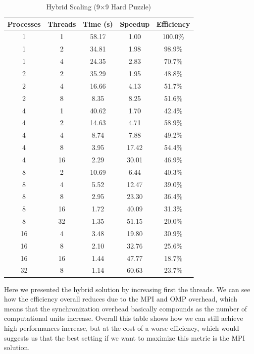 \begin{table}[htbp]
\caption{Hybrid Scaling (9×9 Hard Puzzle)}
\begin{center}
\begin{tabular}{@{}ccccc@{}}
\toprule
\textbf{Processes} & \textbf{Threads} & \textbf{Time (s)} & \textbf{Speedup} & \textbf{Efficiency} \\
\midrule
1  & 1  & 58.17 & 1.00  & 100.0\% \\
1  & 2  & 34.81 & 1.98  & 98.9\% \\
1  & 4  & 24.35 & 2.83  & 70.7\% \\
2  & 2  & 35.29 & 1.95  & 48.8\% \\
2  & 4  & 16.66 & 4.13  & 51.7\% \\
2  & 8  & 8.35  & 8.25  & 51.6\% \\
4  & 1  & 40.62 & 1.70  & 42.4\% \\
4  & 2  & 14.63 & 4.71  & 58.9\% \\
4  & 4  & 8.74  & 7.88  & 49.2\% \\
4  & 8  & 3.95  & 17.42 & 54.4\% \\
4  & 16 & 2.29  & 30.01 & 46.9\% \\
8  & 2  & 10.69 & 6.44  & 40.3\% \\
8  & 4  & 5.52  & 12.47 & 39.0\% \\
8  & 8  & 2.95  & 23.30 & 36.4\% \\
8  & 16 & 1.72  & 40.09 & 31.3\% \\
8  & 32 & 1.35  & 51.15 & 20.0\% \\
16 & 4  & 3.48  & 19.80 & 30.9\% \\
16 & 8  & 2.10  & 32.76 & 25.6\% \\
16 & 16 & 1.44  & 47.77 & 18.7\% \\
32 & 8  & 1.14  & 60.63 & 23.7\% \\
\bottomrule
\end{tabular}
\end{center}
\label{tab:hybrid_scaling}
\end{table}


Here we presented the hybrid solution by increasing first the threads. We can see how the efficiency overall reduces due to the MPI and OMP overhead, which means that the synchronization overhead basically compounds as the number of computational units increase. Overall this table shows how we can still achieve high performances increase, but at the cost of a worse efficiency, which would suggests us that the best setting if we want to maximize this metric is the MPI solution.
